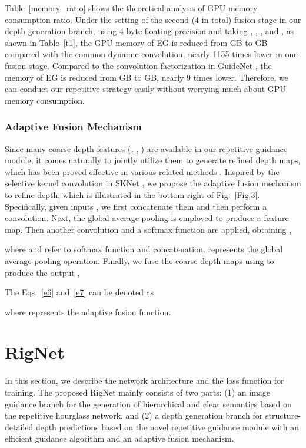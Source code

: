 \documentclass[runningheads]{llncs}
\begin{document}
Table~\ref{memory_ratio} shows the theoretical analysis of GPU memory consumption ratio. Under the setting of the second (4 in total) fusion stage in our depth generation branch, using 4-byte floating precision and taking , , , and , as shown in Table~\ref{t1}, the GPU memory of EG is reduced from GB to GB compared with the common dynamic convolution, nearly 1155 times lower in one fusion stage. Compared to the convolution factorization in GuideNet \cite{tang2020learning}, the memory of EG is reduced from GB to GB, nearly 9 times lower. Therefore, we can conduct our repetitive strategy easily without worrying much about GPU memory consumption.
\vspace{-15pt}

\subsubsection{Adaptive Fusion Mechanism}\label{AF}
Since many coarse depth features (, , ) are available in our repetitive guidance module, it comes naturally to jointly utilize them to generate refined depth maps, which has been proved effective in various related methods \cite{zhao2017pyramid,lin2017feature,Cheng2020CSPN,song2020channel,park2020nonlocal,hu2020PENet}. Inspired by the selective kernel convolution in SKNet \cite{li2019selective}, we propose the adaptive fusion mechanism to refine depth, which is illustrated in the bottom right of Fig.~\ref{Fig.3}. Specifically, given inputs , we first concatenate them and then perform a  convolution. Next, the global average pooling is employed to produce a  feature map. Then another  convolution and a softmax function are applied, obtaining ,

where  and  refer to softmax function and concatenation.  represents the global average pooling operation.
Finally, we fuse the  coarse depth maps using  to produce the output ,

The Eqs.~\ref{e6} and~\ref{e7} can be denoted as

where  represents the adaptive fusion function.


\section{RigNet}
In this section, we describe the network architecture and the loss function for training. The proposed RigNet mainly consists of two parts: (1) an image guidance branch for the generation of hierarchical and clear semantics based on the repetitive hourglass network, and (2) a depth generation branch for structure-detailed depth predictions based on the novel repetitive guidance module with an efficient guidance algorithm and an adaptive fusion mechanism. 
\end{document}
